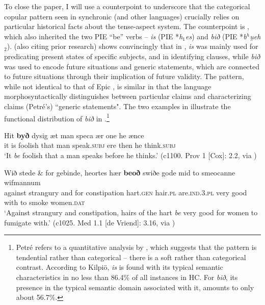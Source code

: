 \documentclass[output=paper,hidelinks]{langscibook}
\begin{document}
\begin{exe}
\begin{xlist}
\begin{xlist}
\begin{exe}
\begin{exe}
\begin{exe}
\begin{exe}
\begin{xlist}
\begin{exe}
\begin{xlist}
\begin{exe}
\begin{xlist}
To close the paper, I will use a counterpoint to underscore that the categorical copular pattern seen in synchronic  (and other  languages) crucially relies on particular historical facts about the  tense-aspect system. The counterpoint is , which also inherited the two PIE ``be'' verbs -- \emph{is} (PIE *\emph{h$_1$es}) and \emph{bið} (PIE *\emph{b$^h$u̯eh$_2$}). \citet{petre2013} (also citing prior research)
shows convincingly that in , \textit{is} was mainly used for predicating present states of specific subjects, and in identifying clauses, while \textit{bið} was used to encode future situations and generic statements, which are connected to future situations through their implication of future validity. The pattern, while not identical to that of Epic , is similar in that the language morphosyntactically distinguishes between particular claims and characterizing claims (Petr\'{e}'s) ``generic statements". The two examples in  illustrate the functional distribution of \textit{bið} in .\footnote{Petr\'{e} refers to a quantitative analysis by \citet{kilpio1993}, which suggests that the pattern is tendential rather than categorical -- there is a soft rather than categorical contrast. According to Kilpi\"{o}, \textit{is} is found with its typical semantic characteristics in no less than 86.4\% of all instances in HC. For \textit{bið}, its presence in the typical semantic domain associated with it, amounts to only about 56.7\%.}

\ea \label{oldeng}
\ea
\gll Hit \textbf{byð} dysig \textthorn æt man speca ær \textthorn one he \textthorn ænce\\
it is foolish that man speak.\textsc{subj} ere then he think.\textsc{subj}\\
\glt `It \textit{be} foolish that a man speaks before he thinks.' {(c1100. Prov 1 [Cox]: 2.2, via \citealt{petre2013})}

\ex
\gll Wið stede \& for gebinde, heortes hær \textbf{beoð} swiðe gode mid to smeocanne wifmannum\\
against strangury and for constipation hart.\textsc{gen} hair.\textsc{pl} are.\textsc{ind.3.pl} very good with to smoke women.\textsc{dat}\\
\glt `Against strangury and constipation, hairs of the hart \textit{be} very good for women to fumigate with.' {(c1025. Med 1.1 [de Vriend]: 3.16, via \citealt{petre2013})}
\z
\z


\end{xlist}
\end{exe}
\end{xlist}
\end{exe}
\end{xlist}
\end{exe}
\end{exe}
\end{exe}
\end{exe}
\end{xlist}
\end{xlist}
\end{exe}
\end{document}
